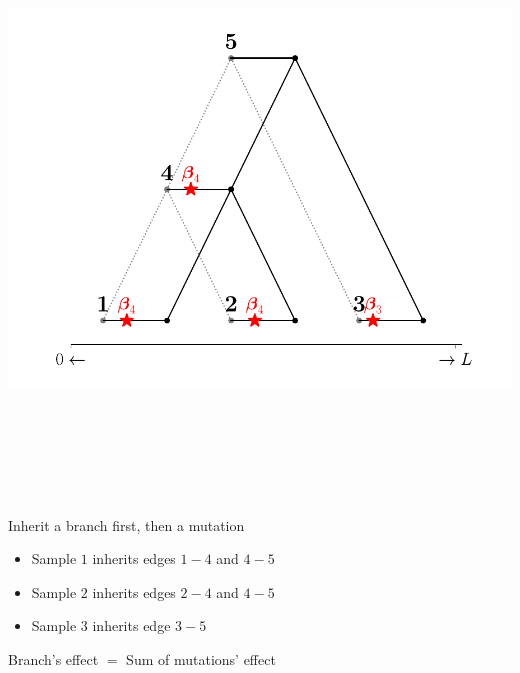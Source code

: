 \documentclass[
  letterpaper,
  DIV=11,
  numbers=noendperiod]{scrartcl}
\providecommand{\tightlist}{%
  \setlength{\itemsep}{0pt}\setlength{\parskip}{0pt}}\usepackage{longtable,booktabs,array}
\begin{document}
\begin{center}
\includegraphics[width=\linewidth,height=6.25in,keepaspectratio]{slides_files/mediabag/imgs/tree-1.pdf}
\end{center}

Inherit a branch first, then a mutation

\begin{itemize}
\tightlist
\item
  Sample \(1\) inherits edges \(1-4\) and \(4-5\)
\end{itemize}

\begin{itemize}
\tightlist
\item
  Sample \(2\) inherits edges \(2-4\) and \(4-5\)
\end{itemize}

\begin{itemize}
\tightlist
\item
  Sample \(3\) inherits edge \(3-5\)
\end{itemize}

Branch's effect \(=\) Sum of mutations' effect
\end{document}
